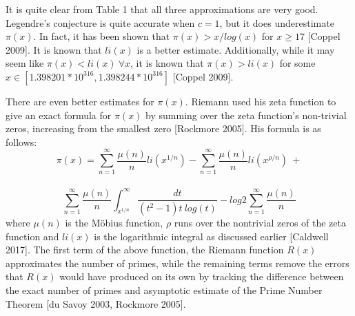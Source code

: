 \documentclass[11pt]{article}
\begin{document}
It is quite clear from Table 1 that all three approximations are very good. Legendre's conjecture is quite accurate when $c = 1$, but it does underestimate $\pi(x)$. In fact, it has been shown that $\pi(x) > x/log(x)$ for $x \geq 17$ [Coppel 2009]. It is known that $li(x)$ is a better estimate. Additionally, while it may seem like $\pi(x) < li(x) \ \forall x$, it is known that $\pi(x) > li(x)$ for some $x \in [1.398201*10^{316},1.398244*10^{316}]$ [Coppel 2009].

There are even better estimates for $\pi(x)$. Riemann used his zeta function to give an exact formula for $\pi(x)$ by summing over the zeta function's non-trivial zeros, increasing from the smallest zero [Rockmore 2005]. His formula is as follows: 
$$\pi(x) = \sum_{n=1}^{\infty}\frac{\mu(n)}{n}li(x^{1/n}) -
\sum_{n=1}^{\infty}\frac{\mu(n)}{n}li(x^{\rho/n}) \ + $$ \ $$
\sum_{n=1}^{\infty}\frac{\mu(n)}{n}\int_{x^{1/n}}^{\infty} \frac{dt}{(t^2-1)t \ log(t)} - log2\sum_{n=1}^{\infty}\frac{\mu(n)}{n}$$ where $\mu(n)$ is the M{\"o}bius function, $\rho$ runs over the nontrivial zeros of the zeta function and $li(x)$ is the logarithmic integral as discussed earlier [Caldwell 2017]. The first term of the above function, the Riemann function $R(x)$ approximates the number of primes, while the remaining terms remove the errors that $R(x)$ would have produced on its own by tracking the difference between the exact number of primes and asymptotic estimate of the Prime Number Theorem [du Savoy 2003, Rockmore 2005]. 
\end{document}
